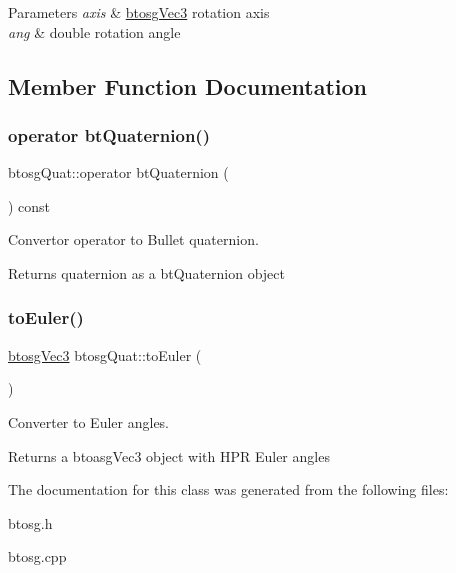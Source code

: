 \begin{DoxyParams}{Parameters}
{\em axis} & \mbox{\hyperlink{classbtosgVec3}{btosg\+Vec3}} rotation axis \\
\hline
{\em ang} & double rotation angle \\
\hline
\end{DoxyParams}


\subsection{Member Function Documentation}
\mbox{\label{classbtosgQuat_addfd68e2130ff8bb51c582524de5a345}} 
\subsubsection{\texorpdfstring{operator btQuaternion()}{operator btQuaternion()}}
{\footnotesize\ttfamily btosg\+Quat\+::operator bt\+Quaternion (\begin{DoxyParamCaption}{ }\end{DoxyParamCaption}) const\hspace{0.3cm}{\ttfamily [inline]}}



Convertor operator to Bullet quaternion. 

Returns quaternion as a bt\+Quaternion object \mbox{\label{classbtosgQuat_aeda394d825b449ab87a77820aad1737d}} 
\subsubsection{\texorpdfstring{toEuler()}{toEuler()}}
{\footnotesize\ttfamily \mbox{\hyperlink{classbtosgVec3}{btosg\+Vec3}} btosg\+Quat\+::to\+Euler (\begin{DoxyParamCaption}{ }\end{DoxyParamCaption})}



Converter to Euler angles. 

Returns a btoasg\+Vec3 object with H\+PR Euler angles 

The documentation for this class was generated from the following files\+:\begin{DoxyCompactItemize}
\item 
btosg.\+h\item 
btosg.\+cpp\end{DoxyCompactItemize}

